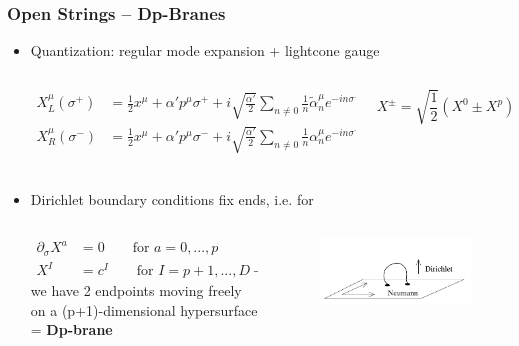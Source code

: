 \documentclass[aspectratio=169]{beamer}
\begin{document}
	\begin{frame}
		\frametitle{Open Strings -- Dp-Branes}
		\begin{itemize}
			\item Quantization: regular mode expansion + lightcone gauge
			\begin{columns}
				\begin{column}{0.6\textwidth}
					\begin{align*}
					X^\mu_{L}(\sigma^+) &= \frac{1}{2}x^\mu + \alpha' p^\mu \sigma^+ + i\sqrt{\frac{\alpha'}{2}} \sum_{n\neq 0} \frac{1}{n} \tilde{\alpha}^\mu_n e^{-in\sigma^+} \\
					X^\mu_{R}(\sigma^-) &= \frac{1}{2}x^\mu + \alpha' p^\mu \sigma^- + i\sqrt{\frac{\alpha'}{2}} \sum_{n\neq 0} \frac{1}{n} \alpha^\mu_n e^{-in\sigma^-} \\
					\end{align*}
				\end{column}
				\begin{column}{0.4\textwidth}
					\begin{equation*}
					X^\pm = \sqrt{\frac{1}{2}}\left(X^0 \pm X^p \right)
					\end{equation*}
				\end{column}
			\end{columns}
			\item Dirichlet boundary conditions fix ends, i.e. for
			\begin{columns}
				\begin{column}{0.6\textwidth}
					\begin{align*}
						\partial_\sigma X^a &= 0 \qquad \text{for } a=0,...,p \\
					X^I &= c^I \qquad \text{for } I=p+1,...,D-1
					\end{align*}
					we have 2 endpoints moving freely on a (p+1)-dimensional hypersurface = \textbf{Dp-brane}
				\end{column}
				\begin{column}{0.4\textwidth}
					\begin{figure}
						\centering
						\includegraphics[width=0.7\linewidth]{res/boundary}
					\end{figure}	
				\end{column}
			\end{columns}
		\end{itemize}
	\end{frame}
\end{document}

